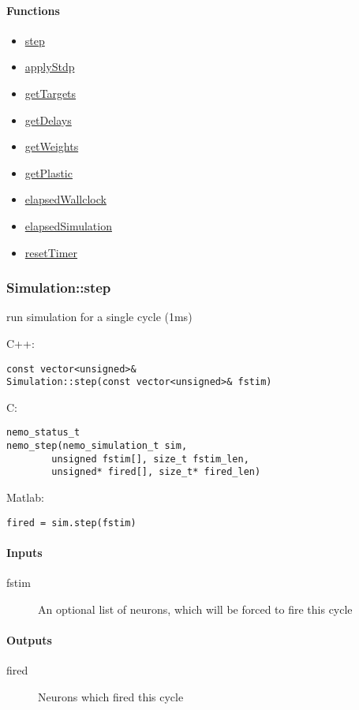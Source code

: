\paragraph{Functions}
\begin{itemize}
\item \hyperref[fn: step]{step}
\item \hyperref[fn: applyStdp]{applyStdp}
\item \hyperref[fn: getTargets]{getTargets}
\item \hyperref[fn: getDelays]{getDelays}
\item \hyperref[fn: getWeights]{getWeights}
\item \hyperref[fn: getPlastic]{getPlastic}
\item \hyperref[fn: elapsedWallclock]{elapsedWallclock}
\item \hyperref[fn: elapsedSimulation]{elapsedSimulation}
\item \hyperref[fn: resetTimer]{resetTimer}
\end{itemize}
\clearpage
\subsubsection*{Simulation::step}
\label{fn: step}
run simulation for a single cycle (1ms)


\noindent C++:
\begin{lstlisting}[aboveskip=2pt]
const vector<unsigned>&
Simulation::step(const vector<unsigned>& fstim)
\end{lstlisting}

\noindent C:
\begin{lstlisting}[aboveskip=2pt]
nemo_status_t
nemo_step(nemo_simulation_t sim, 
        unsigned fstim[], size_t fstim_len, 
        unsigned* fired[], size_t* fired_len)
\end{lstlisting}

\noindent Matlab:
\begin{lstlisting}[aboveskip=2pt]
fired = sim.step(fstim)
\end{lstlisting}
\paragraph{Inputs}
\begin{description}
\item[fstim] An optional list of neurons, which will be forced to fire this cycle
\end{description}
\paragraph{Outputs}
\begin{description}
\item[fired] Neurons which fired this cycle
\end{description}

